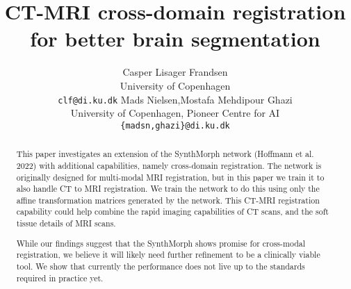 \documentclass{article}
\title{
  CT-MRI cross-domain registration for better brain segmentation%
}
\author{Casper Lisager Frandsen\\
  University of Copenhagen\\
  \texttt{clf@di.ku.dk}
  \AND           %
  Mads Nielsen,\;\;Mostafa Mehdipour Ghazi\\
  University of Copenhagen, Pioneer Centre for AI\\
  \texttt{\{madsn,ghazi\}@di.ku.dk}
}
\begin{document}
\maketitle

\begin{abstract} %
  This paper investigates an extension of the SynthMorph network (Hoffmann et al. 2022)\cite{synthmorphModel} with additional capabilities, namely cross-domain registration. The network is originally designed for multi-modal MRI registration, but in this paper we train it to also handle CT to MRI registration. We train the network to do this using only the affine transformation matrices generated by the network. This CT-MRI registration capability could help combine the rapid imaging capabilities of CT scans, and the soft tissue details of MRI scans.

  While our findings suggest that the SynthMorph shows promise for cross-modal registration, we believe it will likely need further refinement to be a clinically viable tool. We show that currently the performance does not live up to the standards required in practice yet.
\end{abstract}
\newpage
\tableofcontents
%
\end{document}
